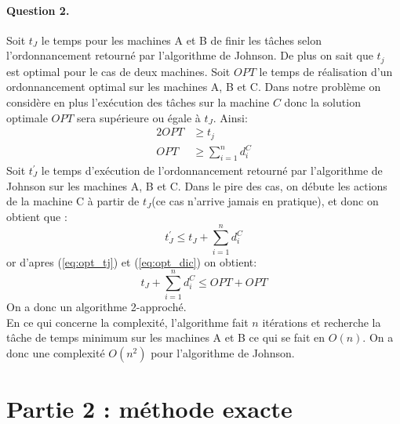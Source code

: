 \documentclass[a4paper, 10pt]{article}
\begin{document}
	\paragraph{Question 2.}{Soit $t_J$ le temps pour les machines A et B de finir les tâches selon l'ordonnancement retourné par l'algorithme de Johnson. De plus on sait que $t_j$ est optimal pour le cas de deux machines. Soit $OPT$ le temps de réalisation d'un ordonnancement optimal sur les machines A, B et C.
          Dans notre problème on considère en plus l'exécution des tâches sur la machine $C$ donc la solution optimale $OPT$ sera supérieure ou égale à $t_J$. Ainsi:
          \begin{alignat}{2}
          	\label{eq:opt_tj}
          	OPT &\geq t_j \\
          	\label{eq:opt_dic}
          	OPT &\geq \sum_{i=1}^n d_i^C
          \end{alignat}
          Soit $t^\prime_J$ le temps d'exécution de l'ordonnancement retourné par l'algorithme de Johnson sur les machines A, B et C. Dans le pire des cas, on débute les actions de la machine C à partir de $t_J$(ce cas n'arrive jamais en pratique), et donc on obtient que :
          \begin{equation*}
	          t^\prime_J \le t_J + \sum_{i=1}^n d_i^C
	      \end{equation*}
	      or d'apres (\ref{eq:opt_tj}) et (\ref{eq:opt_dic}) on obtient:
		\begin{equation*}
			t_J + \sum_{i=1}^n d_i^C \le OPT + OPT
		\end{equation*}
		On a donc un algorithme 2-approché.\\[0.35cm]
		En ce qui concerne la complexité, l'algorithme fait $n$ itérations et recherche la tâche de temps minimum sur les machines A et B ce qui se fait en $O(n)$. On a donc une complexité $O(n^2)$ pour l'algorithme de Johnson.
		}
		
	\section*{Partie 2 : méthode exacte}
		
\end{document}
